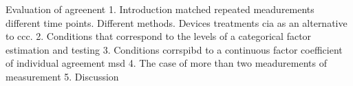 Evaluation of agreenent
1. Introduction 
matched repeated meadurements
different time points. Different methods. Devices treatments
cia as an alternative to ccc.
2. Conditions that correspond to the levels of a categorical factor
estimation and testing
3. Conditions corrspibd to a continuous factor
coefficient of individual agreement
msd
4. The case of more than two meadurements of measurement
5. Discussion
